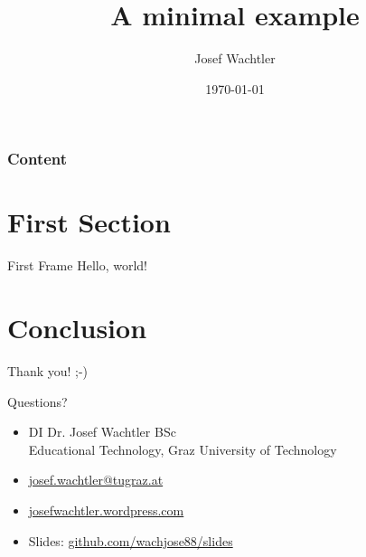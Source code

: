 \documentclass{beamer}
\title{A minimal example}
\date{\today}
\author{Josef Wachtler}
\institute{Educational Technology, Graz University of Technology}
\begin{document}

\maketitle


\begin{frame}
  \frametitle{Content}
  \tableofcontents%
\end{frame}



\section{First Section}


\begin{frame}{First Frame}
Hello, world!
\end{frame}



\section{Conclusion}

\begin{frame}{Thank you! ;-)}
  
  \begin{center}
    \begin{huge}
      Questions?
    \end{huge}
  \end{center}
 
  \begin{itemize}
    \item DI Dr. Josef Wachtler BSc \\
    Educational Technology, Graz University of Technology
    \item \href{mailto:josef.wachtler@tugraz.at}{josef.wachtler@tugraz.at} 
    \item \href{https://josefwachtler.wordpress.com/}{josefwachtler.wordpress.com} 
    \item Slides: \href{https://github.com/wachjose88/slides}{github.com/wachjose88/slides}
  \end{itemize}
  

\end{frame}
\end{document}
